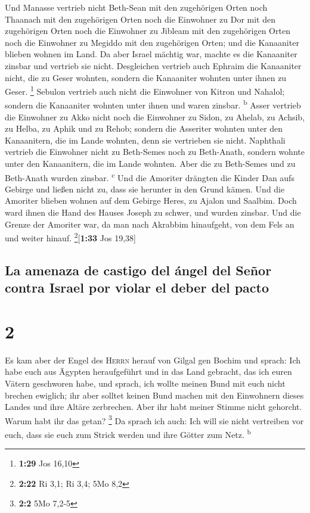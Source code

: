  Und Manasse vertrieb nicht Beth-Sean mit den zugehörigen
Orten noch Thaanach mit den zugehörigen Orten noch die Einwohner zu Dor
mit den zugehörigen Orten noch die Einwohner zu Jibleam mit den
zugehörigen Orten noch die Einwohner zu Megiddo mit den zugehörigen
Orten; und die Kanaaniter blieben wohnen im Land.  Da
aber Israel mächtig war, machte es die Kanaaniter zinsbar und vertrieb
sie nicht.  Desgleichen vertrieb auch Ephraim die
Kanaaniter nicht, die zu Geser wohnten, sondern die Kanaaniter wohnten
unter ihnen zu Geser. \footnote{\textbf{1:29} Jos 16,10} 
Sebulon vertrieb auch nicht die Einwohner von Kitron und Nahalol;
sondern die Kanaaniter wohnten unter ihnen und waren zinsbar.
\textsuperscript{b}  Asser vertrieb die Einwohner zu Akko
nicht noch die Einwohner zu Sidon, zu Ahelab, zu Achsib, zu Helba, zu
Aphik und zu Rehob;  sondern die Asseriter wohnten unter
den Kanaanitern, die im Lande wohnten, denn sie vertrieben sie nicht.
 Naphthali vertrieb die Einwohner nicht zu Beth-Semes
noch zu Beth-Anath, sondern wohnte unter den Kanaanitern, die im Lande
wohnten. Aber die zu Beth-Semes und zu Beth-Anath wurden zinsbar.
\textsuperscript{c}  Und die Amoriter drängten die Kinder
Dan aufs Gebirge und ließen nicht zu, dass sie herunter in den Grund
kämen.  Und die Amoriter blieben wohnen auf dem Gebirge
Heres, zu Ajalon und Saalbim. Doch ward ihnen die Hand des Hauses Joseph
zu schwer, und wurden zinsbar.  Und die Grenze der
Amoriter war, da man nach Akrabbim hinaufgeht, von dem Fels an und
weiter hinauf. \footnote{\textbf{2:22} Ri 3,1; Ri 3,4; 5Mo 8,2}{[}\textbf{1:33}
Jos 19,38{]}

\hypertarget{la-amenaza-de-castigo-del-uxe1ngel-del-seuxf1or-contra-israel-por-violar-el-deber-del-pacto}{%
\subsection{La amenaza de castigo del ángel del Señor contra Israel por
violar el deber del
pacto}\label{la-amenaza-de-castigo-del-uxe1ngel-del-seuxf1or-contra-israel-por-violar-el-deber-del-pacto}}

\hypertarget{section-1}{%
\section{2}\label{section-1}}

 Es kam aber der Engel des \textsc{Herrn} herauf von
Gilgal gen Bochim und sprach: Ich habe euch aus Ägypten heraufgeführt
und in das Land gebracht, das ich euren Vätern geschworen habe, und
sprach, ich wollte meinen Bund mit euch nicht brechen ewiglich;
 ihr aber solltet keinen Bund machen mit den Einwohnern
dieses Landes und ihre Altäre zerbrechen. Aber ihr habt meiner Stimme
nicht gehorcht. Warum habt ihr das getan? \footnote{\textbf{2:2} 5Mo
  7,2-5}  Da sprach ich auch: Ich will sie nicht
vertreiben vor euch, dass sie euch zum Strick werden und ihre Götter zum
Netz. \textsuperscript{b}

